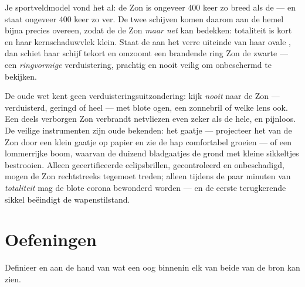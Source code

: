 \begin{example}\label{ex:g7:shadows-eclipses:coincidence}
Je sportveldmodel vond het al: de Zon is ongeveer $400$ keer zo breed
als de  --- en staat ongeveer $400$ keer zo ver. De twee schijven
komen daarom aan de hemel bijna precies overeen, zodat de  de
Zon \emph{maar net} kan bedekken: totaliteit is kort en haar
kernschaduwvlek klein. Staat de  aan het verre uiteinde van haar
 ovale , dan schiet haar schijf tekort en omzoomt een
brandende ring Zon de zwarte  --- een \emph{ringvormige}
verduistering, prachtig en nooit veilig om onbeschermd te bekijken.
\end{example}

\begin{remark}\label{rem:g7:shadows-eclipses:safety}
De oude wet kent geen verduisteringsuitzondering: kijk \emph{nooit}
naar de Zon --- verduisterd, geringd of heel --- met blote ogen, een
zonnebril of welke lens ook. Een deels verborgen Zon verbrandt
netvliezen even zeker als de hele, en pijnloos. De veilige
instrumenten zijn oude bekenden: het gaatje --- projecteer het
 van de Zon door een klein gaatje op papier en zie de hap
comfortabel groeien --- of een lommerrijke boom, waarvan de duizend
bladgaatjes de grond met kleine sikkeltjes bestrooien. Alleen
gecertificeerde eclipsbrillen, gecontroleerd en onbeschadigd, mogen de
Zon rechtstreeks tegemoet treden; alleen tijdens de paar minuten van
\emph{totaliteit} mag de blote corona bewonderd worden --- en de
eerste terugkerende sikkel beëindigt de wapenstilstand.
\end{remark}

\section{Oefeningen}

\begin{exercise}[$\star$]\label{exo:g7:shadows-eclipses:1}
Definieer  en  aan de hand van wat een oog
binnenin elk van beide van de bron kan zien.
\end{exercise}

